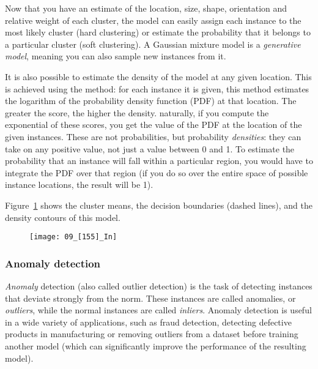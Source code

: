 Now that you have an estimate of the location, size, shape, orientation and relative weight of each cluster, the model can easily assign each instance to the most likely cluster (hard clustering) or estimate the probability that it belongs to a particular cluster (soft clustering). A Gaussian mixture model is a \emph{generative model}, meaning you can also sample new instances from it.

It is also possible to estimate the density of the model at any given location. This is achieved using the  method: for each instance it is given, this method estimates the logarithm of the probability density function (PDF) at that location. The greater the score, the higher the density. naturally, if you compute the exponential of these scores, you get the value of the PDF at the location of the given instances. These are not probabilities, but probability \emph{densities}: they can take on any positive value, not just a value between 0 and 1. To estimate the probability that an instance will fall within a particular region, you would have to integrate the PDF over that region (if you do so over the entire space of possible instance locations, the result will be 1).

Figure~\ref{09_[155]_In} shows the cluster means, the decision boundaries (dashed lines), and the density contours of this model.
\begin{figure}[h!t]
\centering
\texttt{[image: 09\_[155]\_In]}
\caption{}\label{09_[155]_In}
\end{figure}
\subsubsection{Anomaly detection}
\emph{Anomaly} detection (also called outlier detection) is the task of detecting instances that deviate strongly from the norm. These instances are called anomalies, or \emph{outliers}, while the normal instances are called \emph{inliers}. Anomaly detection is useful in a wide variety of applications, such as fraud detection, detecting defective products in manufacturing or removing outliers from a dataset before training another model (which can significantly improve the performance of the resulting model).

